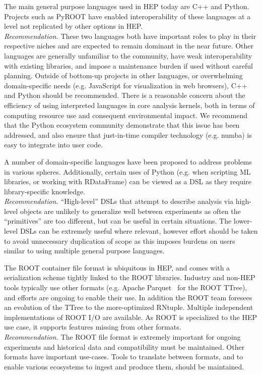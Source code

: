 The main general purpose languages used in HEP today are C++ and Python. Projects such as PyROOT have enabled interoperability of these languages at a level not replicated by other options in HEP.\\
\textit{Recommendation.} These two languages both have important roles to play in their respective niches and are expected to remain dominant in the near future. Other languages are generally unfamiliar to the community, have weak interoperability with existing libraries, and impose a maintenance burden if used without careful planning. Outside of bottom-up projects in other languages, or overwhelming domain-specific needs (e.g. JavaScript for visualization in web browsers), C++ and Python should be recommended. There is a reasonable concern about the efficiency of using interpreted languages in core analysis kernels, both in terms of computing resource use and consequent environmental impact. We recommend that the Python ecosystem community demonstrate that this issue has been addressed, and also ensure that just-in-time compiler technology (e.g. numba) is easy to integrate into user code.

A number of domain-specific languages have been proposed to address problems in various spheres. Additionally, certain uses of Python (e.g. when scripting ML libraries, or working with RDataFrame) can be viewed as a DSL as they require library-specific knowledge.\\
\textit{Recommendation.} ``High-level'' DSLs that attempt to describe analysis via high-level objects are unlikely to generalize well between experiments as often the ``primitives'' are too different, but can be useful in certain situations. The lower-level DSLs can be extremely useful where relevant, however effort should be taken to avoid unnecessary duplication of scope as this imposes burdens on users similar to using multiple general purpose languages.

The ROOT container file format is ubiquitous in HEP, and comes with a serialization scheme tightly linked to the ROOT libraries. Industry and non-HEP tools typically use other formats (e.g. Apache Parquet~\cite{Parquet} for the ROOT TTree), and efforts are ongoing to enable their use. In addition the ROOT team foresees an evolution of the TTree to the more-optimized RNtuple. Multiple independent implementations of ROOT I/O are available. As ROOT is specialized to the HEP use case, it supports features missing from other formats.\\
\textit{Recommendation.} The ROOT file format is extremely important for ongoing experiments and historical data and compatibility must be maintained. Other formats have important use-cases. Tools to translate between formats, and to enable various ecosystems to ingest and produce them, should be maintained.

